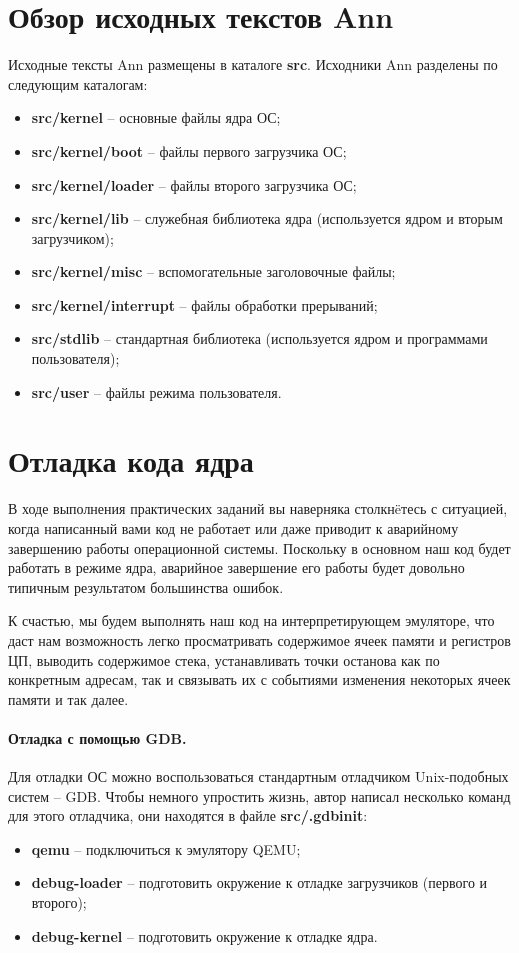 \section{Обзор исходных текстов Ann}
Исходные тексты Ann размещены в каталоге \textbf{src}. Исходники Ann разделены
по следующим каталогам:
\begin{itemize}
\item \textbf{src/kernel} -- основные файлы ядра ОС;
\item \textbf{src/kernel/boot} -- файлы первого загрузчика ОС;
\item \textbf{src/kernel/loader} -- файлы второго загрузчика ОС;
\item \textbf{src/kernel/lib} -- служебная библиотека ядра (используется ядром
	и вторым загрузчиком);
\item \textbf{src/kernel/misc} -- вспомогательные заголовочные файлы;
\item \textbf{src/kernel/interrupt} -- файлы обработки прерываний;
\item \textbf{src/stdlib} -- стандартная библиотека (используется ядром и
	программами пользователя);
\item \textbf{src/user} -- файлы режима пользователя.
\end{itemize}

\section{Отладка кода ядра}
В ходе выполнения практических заданий вы наверняка столкнëтесь
с ситуацией, когда написанный вами код не работает или даже приводит к
аварийному завершению работы операционной системы. Поскольку в основном наш
код будет работать в режиме ядра, аварийное завершение его
работы будет довольно типичным результатом большинства ошибок.

К счастью, мы будем выполнять наш код на интерпретирующем эмуляторе,
что даст нам возможность легко просматривать содержимое ячеек
памяти и регистров ЦП, выводить содержимое стека, устанавливать точки
останова как по конкретным адресам, так и связывать их с событиями
изменения некоторых ячеек памяти и так далее.

\paragraph{Отладка с помощью GDB.} Для отладки ОС можно воспользоваться
стандартным отладчиком Unix-подобных систем -- GDB. Чтобы немного упростить
жизнь, автор написал несколько команд для этого отладчика, они находятся в
файле \textbf{src/.gdbinit}:
\begin{itemize}
\item \textbf{qemu} -- подключиться к эмулятору QEMU;
\item \textbf{debug-loader} -- подготовить окружение к отладке загрузчиков (первого и
	второго);
\item \textbf{debug-kernel} -- подготовить окружение к отладке ядра.
\end{itemize}

